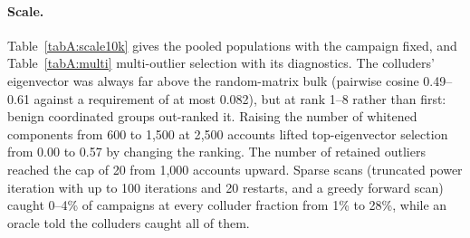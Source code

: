 \paragraph{Scale.} Table~\ref{tabA:scale10k} gives the pooled populations with the campaign fixed, and Table~\ref{tabA:multi} multi-outlier selection with its diagnostics. The colluders' eigenvector was always far above the random-matrix bulk (pairwise cosine 0.49--0.61 against a requirement of at most 0.082), but at rank 1--8 rather than first: benign coordinated groups out-ranked it. Raising the number of whitened components from 600 to 1{,}500 at 2{,}500 accounts lifted top-eigenvector selection from 0.00 to 0.57 by changing the ranking. The number of retained outliers reached the cap of 20 from 1{,}000 accounts upward. Sparse scans (truncated power iteration with up to 100 iterations and 20 restarts, and a greedy forward scan) caught 0--4\% of campaigns at every colluder fraction from 1\% to 28\%, while an oracle told the colluders caught all of them.

